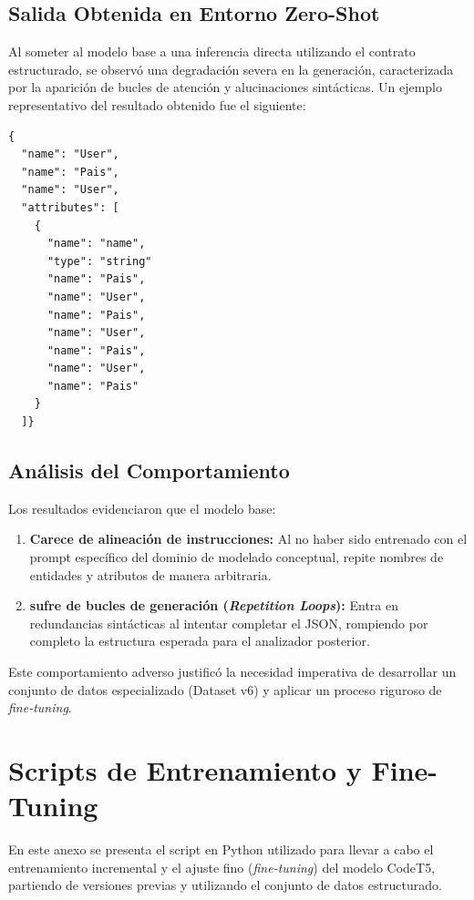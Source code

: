 \section{Salida Obtenida en Entorno Zero-Shot}
Al someter al modelo base a una inferencia directa utilizando el contrato estructurado, se observó una degradación severa en la generación, caracterizada por la aparición de bucles de atención y alucinaciones sintácticas. Un ejemplo representativo del resultado obtenido fue el siguiente:
\begin{lstlisting}[caption={Resultado de alucinación y bucle infinito en inferencia Zero-Shot con CodeT5-base}, label={anx:zeroshot-output}]
{
  "name": "User",
  "name": "Pais",
  "name": "User",
  "attributes": [
    {
      "name": "name",
      "type": "string"
      "name": "Pais",
      "name": "User",
      "name": "Pais",
      "name": "User",
      "name": "Pais",
      "name": "User",
      "name": "Pais"
    }
  ]}
\end{lstlisting}

\section{Análisis del Comportamiento}

Los resultados evidenciaron que el modelo base:
\begin{enumerate}
    \item \textbf{Carece de alineación de instrucciones:} Al no haber sido entrenado con el prompt específico del dominio de modelado conceptual, repite nombres de entidades y atributos de manera arbitraria.
    \item \textbf{sufre de bucles de generación (\textit{Repetition Loops}):} Entra en redundancias sintácticas al intentar completar el JSON, rompiendo por completo la estructura esperada para el analizador posterior.
\end{enumerate}

Este comportamiento adverso justificó la necesidad imperativa de desarrollar un conjunto de datos especializado (Dataset v6) y aplicar un proceso riguroso de \textit{fine-tuning}.

\chapter{Scripts de Entrenamiento y Fine-Tuning}
\label{anx:script-entrenamiento}

En este anexo se presenta el script en Python utilizado para llevar a cabo el entrenamiento incremental y el ajuste fino (\textit{fine-tuning}) del modelo CodeT5, partiendo de versiones previas y utilizando el conjunto de datos estructurado.

